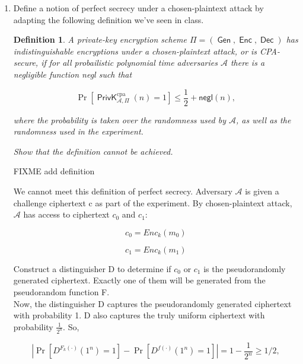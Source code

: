 \documentclass{article}
\newtheorem{definition}{Definition}
\DeclareMathOperator{\PrivK}{\textsf{PrivK}}
\DeclareMathOperator{\Gen}{\textsf{Gen}}
\DeclareMathOperator{\Enc}{\textsf{Enc}}
\DeclareMathOperator{\Dec}{\textsf{Dec}}
\begin{document}
\begin{enumerate}
\begin{proof}
      Thus, we find an equivalent definition that $\mathcal{A}$ can only
      distinguish between the two encryption schemes with negligible
      probability.
    \end{proof}
  \item Define a notion of perfect secrecy under a chosen-plaintext attack by
    adapting the following definition we've seen in class.

    \begin{definition}
      \textit{A private-key encryption scheme $\Pi = (\Gen, \Enc,
        \Dec)$ has \textsf{indistinguishable encryptions under a
        chosen-plaintext attack}, or is \textsf{CPA-secure}, if for all
        probailistic polynomial time adversaries $\mathcal{A}$ there is a
      negligible function \textsf{negl} such that}

        \[
          \Pr\left[\PrivK_{\mathcal{A}, \Pi}^\text{cpa}(n) = 1\right] \leq
          \frac{1}{2} + \textsf{negl}(n),
        \]

        \textit{where the probability is taken over the randomness used by
        $\mathcal{A}$, as well as the randomness used in the experiment.}

        \textit{Show that the definition cannot be achieved.}
    \end{definition}

    FIXME add definition

    We cannot meet this definition of perfect secrecy. Adversary $\mathcal{A}$ is given a challenge ciphertext c as part of the experiment. By chosen-plaintext attack, $\mathcal{A}$ has access to ciphertext $c_0$ and $c_1$:

    \begin{equation}
        c_0 = Enc_k(m_0)
    \end{equation}

    \begin{equation}
        c_1 = Enc_k(m_1)
    \end{equation}

    Construct a distinguisher D to determine if $c_0$ or $c_1$ is the pseudorandomly generated ciphertext. Exactly one of them will be generated from the pseudorandom function F. \\
    
    Now, the distinguisher D captures the pseudorandomly generated ciphertext with probability 1. D also captures the truly uniform ciphertext with probability $\frac{1}{2^n}$. So,

    \[
        \left| \Pr\left[D^{F_k(\cdot)}(1^n) = 1\right] -
      \Pr\left[D^{f(\cdot)}(1^n) = 1\right] \right| 
      = 1 - \frac{1}{2^n}
      \geq 1/2,
      \]
    

\end{enumerate}
\end{document}
